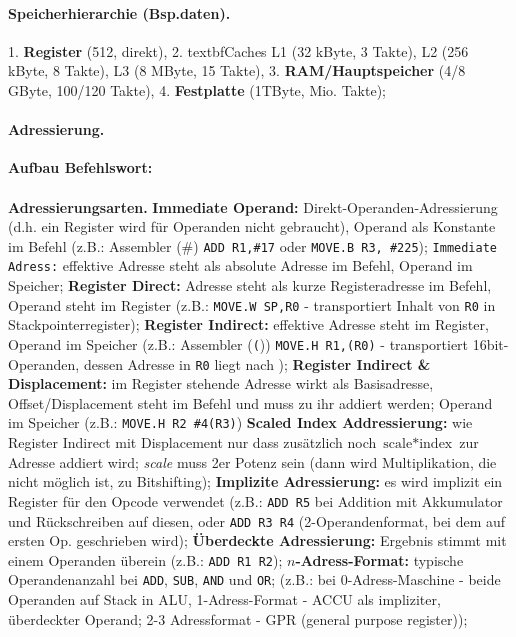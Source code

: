 \documentclass[8pt,a4paper]{article}
\begin{document}
\begin{multicols}{2}
\paragraph{Speicherhierarchie (Bsp.daten).} 1. \textbf{Register} (512, direkt),
2. textbf{Caches} L1 (32 kByte, 3 Takte), L2 (256 kByte, 8 Takte), L3 (8
MByte, 15 Takte), 3. \textbf{RAM/Hauptspeicher} (4/8 GByte, 100/120 Takte), 4. \textbf{Festplatte}
(1TByte, Mio. Takte);

\paragraph{Adressierung.} \textbf{Aufbau Befehlswort:}\\
\\
\textbf{Adressierungsarten.} \textbf{Immediate Operand:}
Direkt-Operanden-Adressierung (d.h. ein Register wird für Operanden
nicht gebraucht), Operand als Konstante im Befehl (z.B.: Assembler (\#)
\texttt{ADD R1,\#17} oder \texttt{MOVE.B R3, \#225}); \texttt{Immediate
  Adress:} effektive Adresse steht als absolute Adresse im Befehl,
Operand im Speicher;
\textbf{Register Direct:} Adresse steht als kurze Registeradresse im
Befehl, Operand steht im Register (z.B.: \texttt{MOVE.W SP,R0} -
transportiert Inhalt von \texttt{R0} in Stackpointerregister);
\textbf{Register Indirect:} effektive Adresse steht im Register,
Operand im Speicher (z.B.: Assembler (\texttt()) \texttt{MOVE.H
  R1,(R0)} - transportiert 16bit-Operanden, dessen Adresse in
\texttt{R0} liegt nach ); \textbf{Register Indirect \&
  Displacement:} im Register stehende Adresse wirkt als Basisadresse,
Offset/Displacement steht im Befehl und muss zu ihr addiert werden;
Operand im Speicher
(z.B.: \texttt{MOVE.H R2 \#4(R3)}) \textbf{Scaled Index
  Addressierung:} wie Register Indirect mit Displacement nur dass
zusätzlich noch $\text{scale}*\text{index}$ zur Adresse addiert wird;
\emph{scale} muss 2er Potenz sein (dann wird Multiplikation, die nicht
möglich ist, zu Bitshifting); \textbf{Implizite Adressierung:} es wird
implizit ein Register für den Opcode verwendet (z.B.: \texttt{ADD R5}
bei Addition mit Akkumulator und Rückschreiben auf diesen, oder
\texttt{ADD R3 R4} (2-Operandenformat, bei dem auf ersten
Op. geschrieben wird); \textbf{Überdeckte Adressierung:} Ergebnis
stimmt mit einem Operanden überein (z.B.: \texttt{ADD R1 R2});
\textbf{$n$-Adress-Format:} typische Operandenanzahl bei \texttt{ADD},
\texttt{SUB}, \texttt{AND} und \texttt{OR}; (z.B.: bei
0-Adress-Maschine - beide Operanden auf Stack in ALU, 1-Adress-Format
- ACCU als impliziter, überdeckter Operand; 2-3 Adressformat - GPR (general purpose register)); 


\end{multicols}
\end{document}

